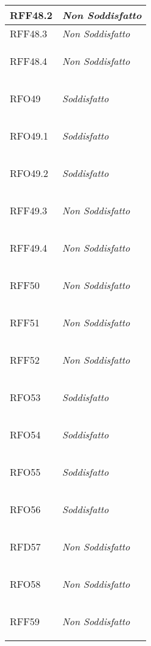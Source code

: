 \begin{longtable}{|>{\centering}m{5cm}|m{5cm}<{\centering}|}
    \hypertarget{RFF48.2}{RFF48.2} & \textit{Non Soddisfatto}\\ \hline
   
    \hypertarget{RFF48.3}{RFF48.3} & \textit{Non Soddisfatto}\\ \hline
   
    \hypertarget{RFF48.4}{RFF48.4} & \textit{Non Soddisfatto}\\ \hline
   
    \hypertarget{RFO49}{RFO49} & \textit{Soddisfatto}\\ \hline
   
    \hypertarget{RFO49.1}{RFO49.1} & \textit{Soddisfatto}\\ \hline
   
    \hypertarget{RFO49.2}{RFO49.2} & \textit{Soddisfatto}\\ \hline
   
    \hypertarget{RFF49.3}{RFF49.3} & \textit{Non Soddisfatto}\\ \hline
   
    \hypertarget{RFF49.4}{RFF49.4} & \textit{Non Soddisfatto}\\ \hline
   
    \hypertarget{RFF50}{RFF50} & \textit{Non Soddisfatto}\\ \hline
   
    \hypertarget{RFF51}{RFF51} & \textit{Non Soddisfatto}\\ \hline
   
    \hypertarget{RFF52}{RFF52} & \textit{Non Soddisfatto}\\ \hline
   
    \hypertarget{RFO53}{RFO53} & \textit{Soddisfatto}\\ \hline
   
    \hypertarget{RFO54}{RFO54} & \textit{Soddisfatto}\\ \hline
   
    \hypertarget{RFO55}{RFO55} & \textit{Soddisfatto}\\ \hline
   
    \hypertarget{RFO56}{RFO56} & \textit{Soddisfatto}\\ \hline
   
    \hypertarget{RFD57}{RFD57} & \textit{Non Soddisfatto}\\ \hline
   
    \hypertarget{RFO58}{RFO58} & \textit{Non Soddisfatto}\\ \hline
   
    \hypertarget{RFF59}{RFF59} & \textit{Non Soddisfatto}\\ \hline
   

\end{longtable}
